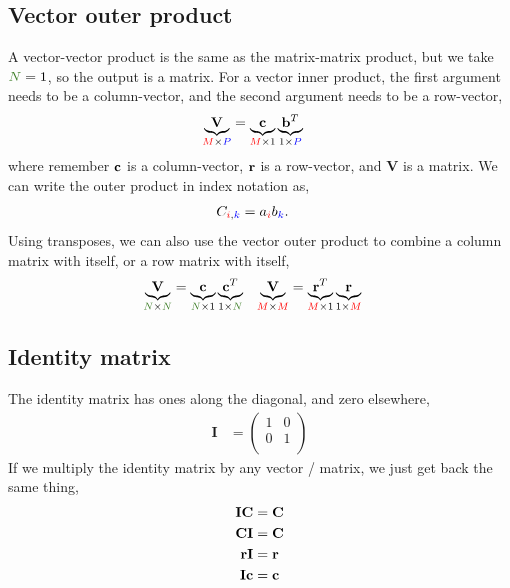 \documentclass{article}
\newcommand{\C}{\mathbf{C}}
\newcommand{\I}{\mathbf{I}}
\renewcommand{\b}{\mathbf{b}}
\begin{document}
\subsection{Vector outer product}
A vector-vector product is the same as the matrix-matrix product, but we take $\N=1$, so the output is a matrix.
For a vector inner product, the first argument needs to be a column-vector, and the second argument needs to be a row-vector,
\begin{align}
  \underbrace{\mathbf{V}}_{\M \times \P} &= \underbrace{\c}_{\M \times 1} \underbrace{\b^T}_{1 \times \P}
\end{align}
where remember $\mathbf{c}$ is a column-vector, $\mathbf{r}$ is a row-vector, and $\mathbf{V}$ is a matrix.
We can write the outer product in index notation as,
\begin{align}
  C_{\textcolor{red}{i},\textcolor{blue}{k}} &= a_{\textcolor{red}{i}} b_{\textcolor{blue}{k}}.
\end{align}
Using transposes, we can also use the vector outer product to combine a column matrix with itself, or a row matrix with itself,
\begin{align}
  \underbrace{\mathbf{V}}_{\N \times \N} &= \underbrace{\c}_{\N \times 1} \underbrace{\c^T}_{1 \times \N} & 
  \underbrace{\mathbf{V}}_{\M \times \M} &= \underbrace{\r^T}_{\M \times 1} \underbrace{\r}_{1 \times \M} 
\end{align}

\subsection{Identity matrix}
The identity matrix has ones along the diagonal, and zero elsewhere,
\begin{align}
  \I &= \begin{pmatrix}
    1 & 0 \\
    0 & 1 \\
  \end{pmatrix}
\end{align}
If we multiply the identity matrix by any vector / matrix, we just get back the same thing,
\begin{align}
  \I \C &= \C \\
  \C \I &= \C \\
  \r \I &= \r \\
  \I \c &= \c
\end{align}
\end{document}
